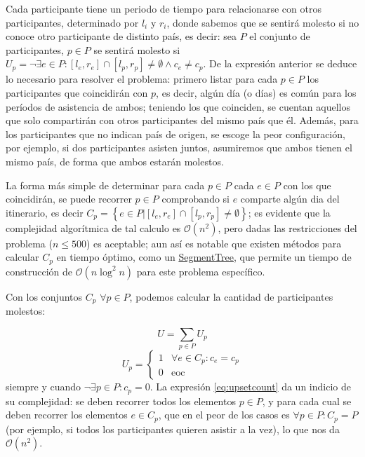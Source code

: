 Cada participante tiene un periodo de tiempo para relacionarse con otros participantes, determinado por \(l_i\) y \(r_i\), donde sabemos que se sentirá molesto si no conoce otro participante de distinto país, es decir: sea \(P\) el conjunto de participantes, \(p\in P\) se sentirá molesto si \(U_p=\lnot\exists e\in P:\left[l_e,r_e\right]\cap\left[l_p,r_p\right]\neq\emptyset\wedge c_e\ne c_p\). De la expresión anterior se deduce lo necesario para resolver el problema: primero listar para cada \(p\in P\) los participantes que coincidirán con \(p\), es decir, algún día (o días) es común para los períodos de asistencia de ambos; teniendo los que coinciden, se cuentan aquellos que solo compartirán con otros participantes del mismo país que él. Además, para los participantes que no indican país de origen, se escoge la peor configuración, por ejemplo, si dos participantes asisten juntos, asumiremos que ambos tienen el mismo país, de forma que ambos estarán molestos.

La forma más simple de determinar para cada \(p\in P\) cada \(e\in P\) con los que coincidirán, se puede recorrer \(p\in P\) comprobando si \(e\) comparte algún dia del itinerario, es decir \(C_p=\left\{e\in P|\left[l_e,r_e\right]\cap\left[l_p,r_p\right]\neq\emptyset\right\}\); es evidente que la complejidad algorítmica de tal calculo es \(\mathcal{O}(n^2)\), pero dadas las restricciones del problema (\(n\leq500\)) es aceptable; aun así es notable que existen métodos para calcular \(C_p\) en tiempo óptimo, como un \href{https://en.wikipedia.org/wiki/Segment_tree}{SegmentTree}, que permite un tiempo de construcción de \(\mathcal{O}(n\log^2{n})\) para este problema específico.

Con los conjuntos \(C_p\) \(\forall p\in P\), podemos calcular la cantidad de participantes molestos:

\begin{equation}
  U=\sum_{p\in P}{U_p}
  \label{eq:upsetcount}
\end{equation}
\begin{equation*}
  U_p=\begin{cases}
    1 & \forall e\in C_p:c_e=c_p \\
    0 & \text{eoc}
  \end{cases}
\end{equation*}
siempre y cuando \(\lnot\exists p\in P:c_p=0\). La expresión \eqref{eq:upsetcount} da un indicio de su complejidad: se deben recorrer todos los elementos \(p\in P\), y para cada cual se deben recorrer los elementos \(e\in C_p\), que en el peor de los casos es \(\forall p\in P:C_p=P\) (por ejemplo, si todos los participantes quieren asistir a la vez), lo que nos da \(\mathcal{O}(n^2)\).

